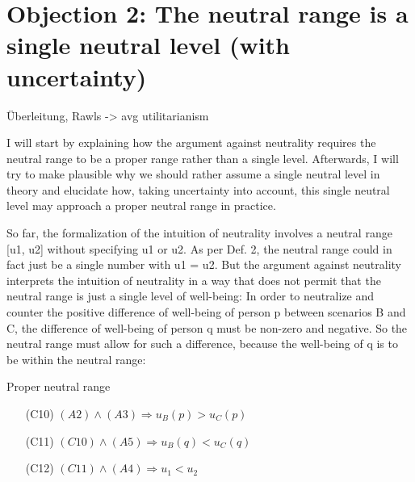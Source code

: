 \section{Objection 2: The neutral range is a single neutral level (with uncertainty)}

Überleitung, Rawls -{\textgreater} avg utilitarianism 

I will start by explaining how the argument against neutrality requires the neutral range to be a proper range rather than a single level. Afterwards, I will try to make plausible why we should rather assume a single neutral level in theory and elucidate how, taking uncertainty into account, this single neutral level may approach a proper neutral range in practice.  

So far, the formalization of the intuition of neutrality involves a neutral range [u1, u2] without specifying u1 or u2. As per Def. 2, the neutral range could in fact just be a single number with u1 = u2. But the argument against neutrality interprets the intuition of neutrality in a way that does not permit that the neutral range is just a single level of well-being: In order to neutralize and counter the positive difference of well-being of person p between scenarios B and C, the difference of well-being of person q must be non-zero and negative. So the neutral range must allow for such a difference, because the well-being of q is to be within the neutral range:

\begin{Corollary}{Proper neutral range}{}
\begin{enumerate}
\item[(C10)] $(A2)  \wedge (A3) \Rightarrow u_B(p) > u_C(p)$
\item[(C11)] $(C10) \wedge (A5) \Rightarrow u_B(q) < u_C(q)$
\item[(C12)] $(C11) \wedge (A4) \Rightarrow u_1 < u_2$
\end{enumerate}
\end{Corollary}

